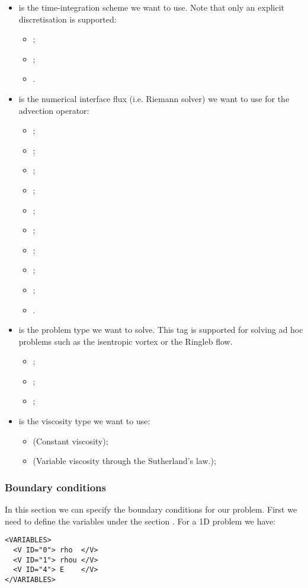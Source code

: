 \begin{itemize}
\item {} is the time-integration scheme we want to use. 
Note that only an explicit discretisation is supported:
\begin{itemize}
\item {};
\item {};
\item {}.
\end{itemize}
\item {} is the numerical interface flux (i.e. Riemann solver) 
we want to use for the advection operator:
\begin{itemize}
\item {};
\item {}; 
\item {}; 
\item {}; 
\item {}; 
\item {};
\item {};
\item {};
\item {};
\item {}.
\end{itemize}
\item {} is the problem type we want to solve. 
This tag is supported for solving ad hoc problems such as the 
isentropic vortex or the Ringleb flow.
\begin{itemize}
\item {};
\item {};
\item {};\\[0.2em]
\end{itemize}
\item {} is the viscosity type we want to use:
\begin{itemize}
\item {} (Constant viscosity);
\item {} (Variable viscosity through the Sutherland's law.);
\end{itemize}
\end{itemize}

\subsubsection*{Boundary conditions}
In this section we can specify the boundary conditions for our problem.
First we need to define the variables under the section .
For a 1D problem we have:
\begin{lstlisting}[style=XmlStyle]        
<VARIABLES>
  <V ID="0"> rho  </V>
  <V ID="1"> rhou </V>
  <V ID="4"> E    </V>
</VARIABLES>
\end{lstlisting}

